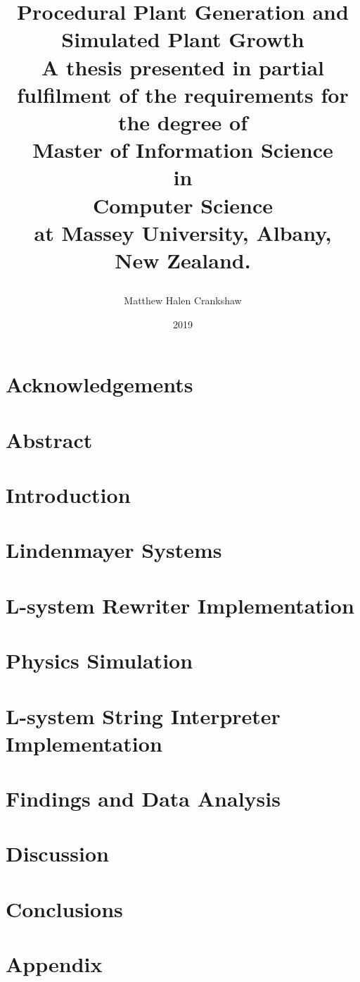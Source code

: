 \documentclass[11pt, twoside]{report}
\title{
{\huge \textbf{Procedural Plant Generation and Simulated Plant Growth }}\\
\vspace{3cm}
{\large A thesis presented in partial fulfilment of the requirements for the degree of \\
\vspace{4cm}
\large \textbf{Master of Information Science}\\
\large \textbf{in}\\
\large \textbf{Computer Science}\\
\vspace{4cm}
\large at Massey University, Albany, \\
\large New Zealand. }
\vspace{3cm}
\author{Matthew Halen Crankshaw}
\date{2019}
}
\begin{document}
\maketitle

\chapter*{Acknowledgements}


\chapter*{Abstract}


\tableofcontents
\listoffigures
\listoftables


\chapter{Introduction}


\chapter{Lindenmayer Systems}  \label{l-system chapter} 


\chapter{L-system Rewriter Implementation}


\chapter{Physics Simulation}


\chapter{L-system String Interpreter Implementation} \label{interpreter implementation}


\chapter{Findings and Data Analysis}


\chapter{Discussion}


\chapter{Conclusions}


\printglossary[type=\acronymtype]
\printglossary

\appendix
\chapter{Appendix}

\end{document}
